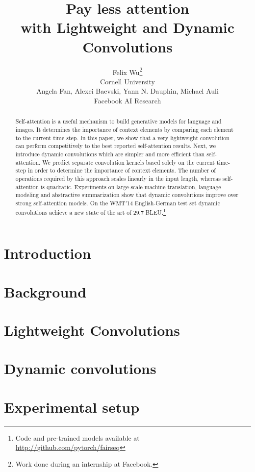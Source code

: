 \documentclass{article} %
\title{Pay less attention\\ with Lightweight and Dynamic Convolutions}
\author{Felix Wu\thanks{Work done during an internship at Facebook.} \\
Cornell University\\
\And
Angela Fan, Alexei Baevski, Yann N. Dauphin, Michael Auli \\
Facebook AI Research \\
}
\begin{document}
\maketitle

\begin{abstract}
Self-attention is a useful mechanism to build generative models for language and images. 
It determines the importance of context elements by comparing each element to the current time step.
In this paper, we show that a very lightweight convolution can perform competitively to the best reported self-attention results.
Next, we introduce dynamic convolutions which are simpler and more efficient than self-attention.
We predict separate convolution kernels based solely on the current time-step in order to determine the importance of context elements. 
The number of operations required by this approach scales linearly in the input length, whereas self-attention is quadratic.
Experiments on large-scale machine translation, language modeling and abstractive summarization show that dynamic convolutions improve over strong self-attention models. 
On the WMT'14 English-German test set dynamic convolutions achieve a new state of the art of 29.7 BLEU.\footnote{Code and pre-trained models available at \url{http://github.com/pytorch/fairseq}} 
\end{abstract}



\section{Introduction}




\section{Background}\label{sec:background}
 


\section{Lightweight Convolutions}\label{sec:sdconv}



\section{Dynamic convolutions}\label{sec:tvsdconv}



\section{Experimental setup}\label{sec:setup}

\end{document}
